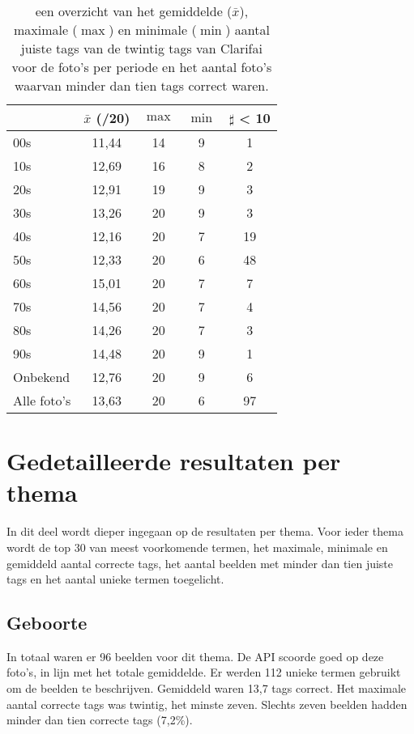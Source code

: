 \begin{table}
	\begin{tabular}{p{3cm}|cccc}
		\toprule
		& $\bar{x}$ (/20) & $\max$ & $\min$ &  $\sharp$ < 10 \\ 
		\midrule
		00s & 11,44 & 14 & 9 & 1 \\ 
		10s & 12,69 & 16 & 8 &  2 \\ 
		20s & 12,91 & 19 & 9 & 3 \\ 
		30s & 13,26 & 20 & 9  & 3 \\ 
		40s & 12,16 & 20 & 7  & 19 \\ 
		50s & 12,33 & 20 & 6  & 48 \\ 
		60s & 15,01 & 20 & 7  & 7 \\ 
		70s & 14,56 & 20 & 7  & 4 \\ 
		80s & 14,26 & 20 & 7  & 3 \\ 
		90s & 14,48 & 20 & 9  & 1 \\ 
		Onbekend & 12,76 & 20 & 9  & 6 \\ 
		Alle foto's & 13,63 & 20 & 6  & 97 \\ 
		\bottomrule
	\end{tabular} 
	\caption[een overzicht van de resultaten per periode na gebruikt van het ingebouwde model van Clarifai]{een overzicht van het gemiddelde ($\bar{x}$), maximale ($\max$) en minimale ($\min$) aantal juiste tags van de twintig tags van Clarifai voor de foto’s per periode en het aantal foto’s waarvan minder dan tien tags correct waren. }
	\label{tab:analyse-resultaten-periode}
\end{table}

\section{Gedetailleerde resultaten per thema}
\label{sec:gedetailleerde-resultaten-per-thema}

In dit deel wordt dieper ingegaan op de resultaten per thema. Voor ieder thema wordt de top 30 van meest voorkomende termen, het maximale, minimale en gemiddeld aantal correcte tags, het aantal beelden met minder dan tien juiste tags en het aantal unieke termen toegelicht. 

\subsection{Geboorte}

In totaal waren er 96 beelden voor dit thema. De API scoorde goed op deze foto’s, in lijn met het totale gemiddelde. Er werden 112 unieke termen gebruikt om de beelden te beschrijven. Gemiddeld waren 13,7 tags correct. Het maximale aantal correcte tags was twintig, het minste zeven. Slechts zeven beelden hadden minder dan tien correcte tags (7,2\%).

